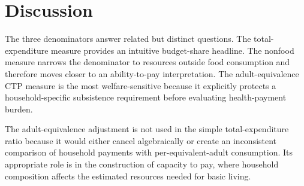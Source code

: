 \documentclass[11pt]{article}
\begin{document}
\section{Discussion}

The three denominators answer related but distinct questions. The total-expenditure measure provides an intuitive budget-share headline. The nonfood measure narrows the denominator to resources outside food consumption and therefore moves closer to an ability-to-pay interpretation. The adult-equivalence CTP measure is the most welfare-sensitive because it explicitly protects a household-specific subsistence requirement before evaluating health-payment burden.

The adult-equivalence adjustment is not used in the simple total-expenditure ratio because it would either cancel algebraically or create an inconsistent comparison of household payments with per-equivalent-adult consumption. Its appropriate role is in the construction of capacity to pay, where household composition affects the estimated resources needed for basic living.



\end{document}

